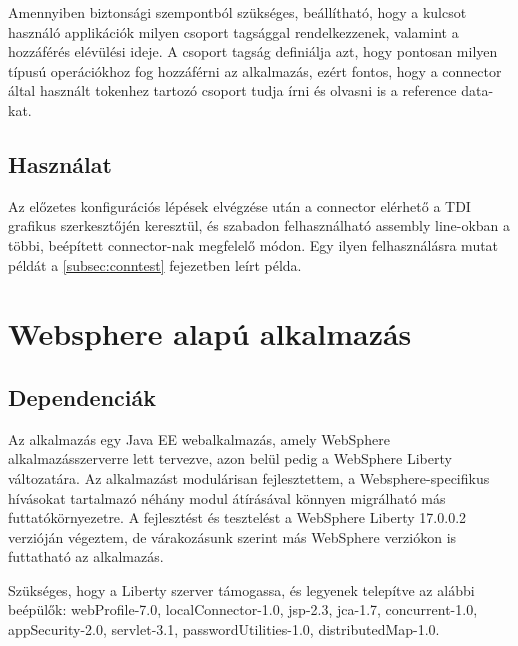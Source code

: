 Amennyiben biztonsági szempontból szükséges, beállítható, hogy a kulcsot használó applikációk milyen csoport tagsággal rendelkezzenek, valamint a hozzáférés elévülési ideje. A csoport tagság definiálja azt, hogy pontosan milyen típusú operációkhoz fog hozzáférni az alkalmazás, ezért fontos, hogy a connector által használt tokenhez tartozó csoport tudja írni és olvasni is a reference data-kat.

\subsection{Használat}
Az előzetes konfigurációs lépések elvégzése után a connector elérhető a TDI grafikus szerkesztőjén keresztül, és szabadon felhasználható assembly line-okban a többi, beépített connector-nak megfelelő módon. Egy ilyen felhasználásra mutat példát a \ref{subsec:conntest} fejezetben leírt példa. \cite{tditutorial}
\section{Websphere alapú alkalmazás}
\subsection{Dependenciák}
Az alkalmazás egy Java EE webalkalmazás, amely WebSphere alkalmazásszerverre lett tervezve, azon belül pedig a WebSphere Liberty változatára. Az alkalmazást modulárisan fejlesztettem, a Websphere-specifikus hívásokat tartalmazó néhány modul átírásával könnyen migrálható más futtatókörnyezetre. A fejlesztést és tesztelést a WebSphere Liberty 17.0.0.2 verzióján végeztem, de várakozásunk szerint más WebSphere verziókon is futtatható az alkalmazás.

Szükséges, hogy a Liberty szerver támogassa, és legyenek telepítve az alábbi beépülők: webProfile-7.0, localConnector-1.0, jsp-2.3, jca-1.7, concurrent-1.0, appSecurity-2.0, servlet-3.1, passwordUtilities-1.0, distributedMap-1.0.

%

